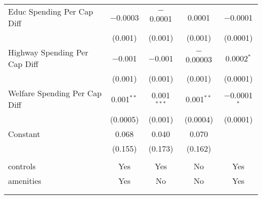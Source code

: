 \begin{table}[!htbp]
\begin{tabular}{@{\extracolsep{5pt}}lcccc}
  Educ Spending Per Cap Diff & $-$0.0003 & $-$0.0001 & 0.0001 & $-$0.0001 \\ 
  & (0.001) & (0.001) & (0.001) & (0.0001) \\ 
  Highway Spending Per Cap Diff & $-$0.001 & $-$0.001 & $-$0.00003 & 0.0002$^{*}$ \\ 
  & (0.001) & (0.001) & (0.001) & (0.0001) \\ 
  Welfare Spending Per Cap Diff & 0.001$^{**}$ & 0.001$^{***}$ & 0.001$^{**}$ & $-$0.0001$^{*}$ \\ 
  & (0.0005) & (0.001) & (0.0004) & (0.0001) \\ 
  Constant & 0.068 & 0.040 & 0.070 &  \\ 
  & (0.155) & (0.173) & (0.162) &  \\ 
 \hline \\[-1.8ex] 
controls & Yes & Yes & No & Yes \\ 
amenities & Yes & No & No & Yes \\ 
\hline \\[-1.8ex] 
\hline 
\hline \\[-1.8ex] 
\end{tabular} 
\end{table} 
